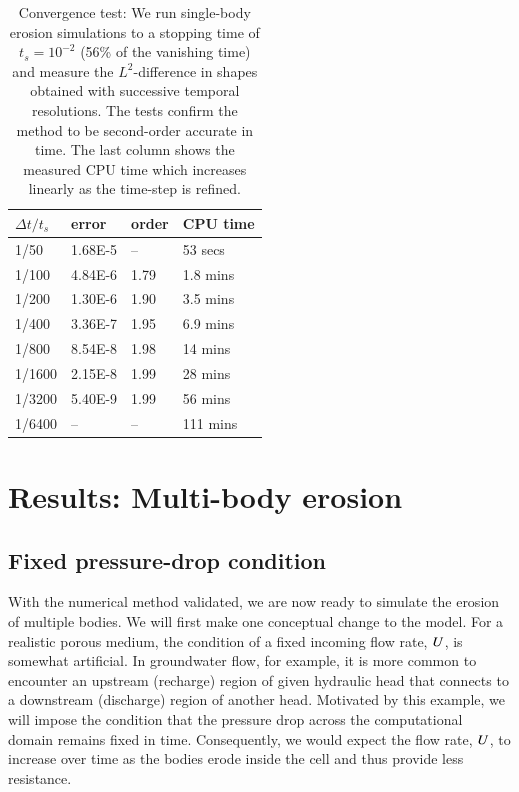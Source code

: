 \documentclass[preprint, 10pt]{elsarticle}
\begin{document}
\begin{table}%
\begin{center}
\caption{Convergence test: We run single-body erosion simulations to a stopping time of $t_s = 10^{-2}$ (56\% of the vanishing time) and measure the $L^2$-difference in shapes obtained with successive temporal resolutions. The tests confirm the method to be second-order accurate in time. The last column shows the measured CPU time which increases linearly as the time-step is refined.
}
\vspace{0.3 pc}
\label{convtab}
\begin{tabular}{l l l l}
\hline
\hspace{0.0pc} $\Delta t/t_s$
\hspace{0.5pc} & error 
\hspace{0.5pc} & order
\hspace{0.5pc} & CPU time \\
\hline
%
1/50		& 1.68E-5		& --		& 53 secs     	\\
1/100	& 4.84E-6		& 1.79	& 1.8 mins   	\\
1/200	& 1.30E-6		& 1.90	& 3.5 mins  	\\
1/400	& 3.36E-7		& 1.95	& 6.9 mins  	\\
1/800	& 8.54E-8		& 1.98	& 14 mins   	\\
1/1600	& 2.15E-8		& 1.99	& 28 mins  	\\
1/3200	& 5.40E-9		& 1.99	& 56 mins    	\\
1/6400	& --			& --		& 111 mins	\\
%
\hline
\end{tabular}
\end{center}
\end{table}



\section{Results: Multi-body erosion}
\label{s:MultiResults}

\subsection{Fixed pressure-drop condition}

With the numerical method validated, we are now ready to simulate the erosion of multiple bodies. We will first make one conceptual change to the model. For a realistic porous medium, the condition of a fixed incoming flow rate, $U$, is somewhat artificial. In groundwater flow, for example, it is more common to encounter an upstream (recharge) region of given hydraulic head that connects to a downstream (discharge) region of another head. Motivated by this example, we will impose the condition that the pressure drop across the computational domain remains fixed in time. Consequently, we would expect the flow rate, $U$, to increase over time as the bodies erode inside the cell and thus provide less resistance.
\end{document}
